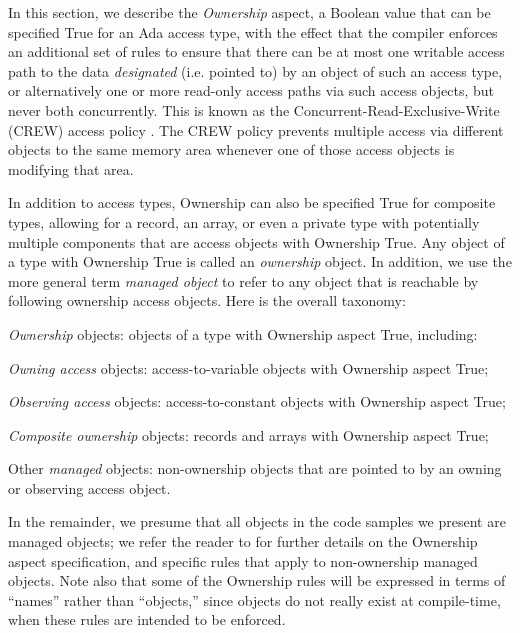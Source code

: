 \documentclass{llncs}
\begin{document}
In this section, we describe the \textit{Ownership} aspect, a Boolean value that can be specified True for an Ada access type, with the effect that the compiler enforces an additional set of rules to ensure that there can be at most one writable access path to the data
\textit{designated} (i.e. pointed to) by an object of such an access type, or alternatively one or more read-only access paths via such access objects, but never both concurrently. This is known as
the Concurrent-Read-Exclusive-Write (CREW) access policy \cite{CREW}. The CREW policy prevents multiple access via different objects to the same memory area whenever one
of those access objects is modifying that area.


In addition to access types, Ownership can also be specified True for composite types, allowing for a record, an array, or even a private type with potentially multiple components that are access objects with Ownership True.  Any object of a type with Ownership True is called an \textit{ownership} object.
In addition, we use the more general term \textit{managed object} to refer to any object that is reachable by following ownership access objects.
Here is the overall taxonomy:

\begin{compactitem}
\item \textit{Ownership} objects: objects of a type with Ownership aspect True, including:
    \begin{compactitem}
\item \textit{Owning access} objects: access-to-variable objects with Ownership aspect True;
\item \textit{Observing access} objects: access-to-constant objects with Ownership aspect True;
\item \textit{Composite ownership} objects: records and arrays with Ownership aspect True;
    \end{compactitem}
\item Other \textit{managed} objects: non-ownership objects that are pointed to by an owning or observing access object.
\end{compactitem}


In the remainder, we presume that all objects in the code samples we present are managed objects; we refer the reader to \cite{AI2018} for further details on
the Ownership aspect specification, and specific rules that apply to non-ownership managed objects. Note also that some of the Ownership rules will be expressed in terms
of ``names'' rather than ``objects,'' since objects do not really exist at compile-time, when these rules are intended to be enforced.
\end{document}
